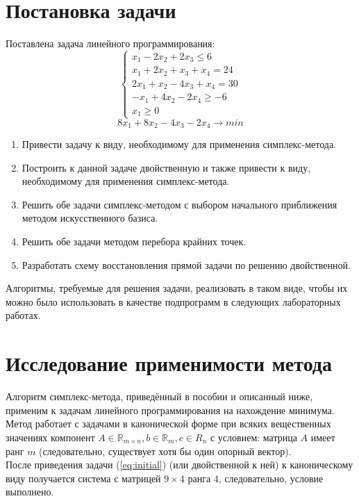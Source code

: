 \documentclass[main.tex]{subfiles}
\begin{document}
\section{Постановка задачи}
Поставлена задача линейного программирования:
\begin{equation}\label{eq:initial}
\left\{
\begin{array}{ll} 
x_1-2x_2+2x_3 \le 6\\
x_1+2x_2+x_3+x_4=24\\
2x_1+x_2-4x_3+x_4=30\\
-x_1+4x_2-2x_4 \ge -6\\
x_1 \ge 0
\end{array}
\right.
\end{equation}
$$ 8x_1 + 8x_2 - 4x_3 - 2x_4 \longrightarrow min $$
\begin{enumerate}
\item Привести задачу к виду, необходимому для применения симплекс-метода.
\item Построить к данной задаче двойственную и также привести к виду, необходимому для применения симплекс-метода.
\item Решить обе задачи симплекс-методом с выбором начального приближения методом искусственного базиса.
\item Решить обе задачи методом перебора крайних точек.
\item Разработать схему восстановления прямой задачи по решению двойственной.
\end{enumerate}
Алгоритмы, требуемые для решения задачи, реализовать в таком виде, чтобы их можно было использовать в качестве подпрограмм в следующих лабораторных работах.
\section{Исследование применимости метода}
Алгоритм симплекс-метода, приведённый в пособии \cite{petuh} и описанный ниже, применим к задачам линейного программирования на нахождение минимума. Метод работает с задачами в канонической форме при всяких вещественных значениях компонент $A \in \mathds{R}_{m\times n}, b \in \mathds{R}_m, c \in R_n$ с условием: матрица $A$ имеет ранг $m$ (следовательно, существует хотя бы один опорный вектор).\\
После приведения задачи (\ref{eq:initial}) (или двойственной к ней) к каноническому виду получается система с матрицей $ 9 \times 4 $ ранга $4$, следовательно, условие выполнено.\\
\end{document}
